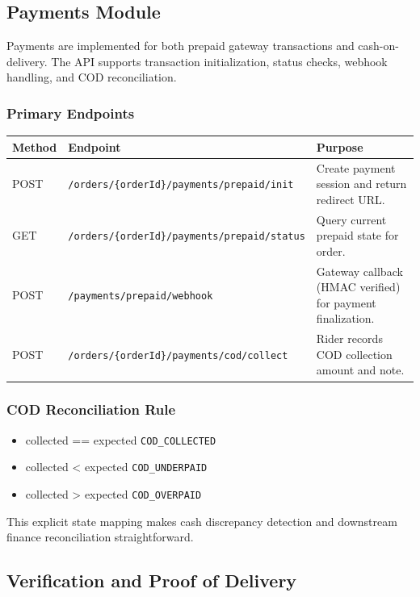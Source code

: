 \subsection{Payments Module}

Payments are implemented for both prepaid gateway transactions and cash-on-delivery.
The API supports transaction initialization, status checks, webhook handling,
and COD reconciliation.

\subsubsection{Primary Endpoints}

\begin{tabularx}{\textwidth}{@{}p{2.2cm}p{5.2cm}X@{}}
\toprule
\textbf{Method} & \textbf{Endpoint} & \textbf{Purpose} \\
\midrule
POST & \texttt{/orders/\{orderId\}/payments/prepaid/init} & Create payment session and return redirect URL. \\
GET & \texttt{/orders/\{orderId\}/payments/prepaid/status} & Query current prepaid state for order. \\
POST & \texttt{/payments/prepaid/webhook} & Gateway callback (HMAC verified) for payment finalization. \\
POST & \texttt{/orders/\{orderId\}/payments/cod/collect} & Rider records COD collection amount and note. \\
\bottomrule
\end{tabularx}

\subsubsection{COD Reconciliation Rule}

\begin{itemize}
		\item collected == expected \Rightarrow \texttt{COD\_COLLECTED}
		\item collected  < expected \Rightarrow \texttt{COD\_UNDERPAID}
		\item collected  > expected \Rightarrow \texttt{COD\_OVERPAID}
\end{itemize}

This explicit state mapping makes cash discrepancy detection and downstream
finance reconciliation straightforward.

\subsection{Verification and Proof of Delivery}

